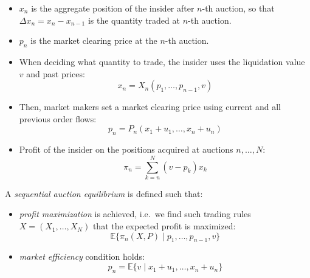 \documentclass{beamer}
\begin{document}
\begin{frame}\small
    \begin{itemize}
        \item $x_n$ is the aggregate position of the insider after $n$-th auction, so that $\Delta x_n = x_n - x_{n-1}$ is the quantity traded at $n$-th auction.
        \item $p_n$ is the market clearing price at the $n$-th auction.
        \item When deciding what quantity to trade, the insider uses the liquidation value $v$ and past prices:
            \begin{equation}
                x_n = X_n(p_1, \ldots, p_{n-1}, v)
            \end{equation}
        \item Then, market makers set a market clearing price using current and all previous order flows:
            \begin{equation}
                p_n = P_n(x_1 + u_1, \ldots, x_n + u_n)
            \end{equation}
        \item Profit of the insider on the positions acquired at auctions $n, \ldots, N$:
            \begin{equation}
                \pi_n = \sum_{k=n}^{N}(v - p_k)x_k
            \end{equation}
    \end{itemize}
\end{frame}

\begin{frame}
    A \textit{sequential auction equilibrium} is defined such that:
    \begin{itemize}
        \item \textit{profit maximization} is achieved, i.e.~we find such trading rules $X=(X_1, \ldots, X_N)$ that the expected profit is maximized:
            \begin{equation}
                \mathbb{E}\{\pi_n(X, P) \mid p_1, \ldots, p_{n-1}, v\}
            \end{equation}
        \item \textit{market efficiency} condition holds:
            \begin{equation}
                p_n = \mathbb{E}\{v \mid x_1 + 
                u_1, \ldots, x_n + u_n\}
            \end{equation}
    \end{itemize}
\end{frame}
\end{document}
